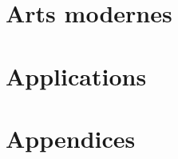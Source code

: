 \documentclass[10pt, a4paper, oneside]{book}
\begin{document}
\part{Arts modernes}




\part{Applications}



% 


\appendix


\part{Appendices}









\printbibliography[heading=bibintoc]
\printindex
\end{document}
